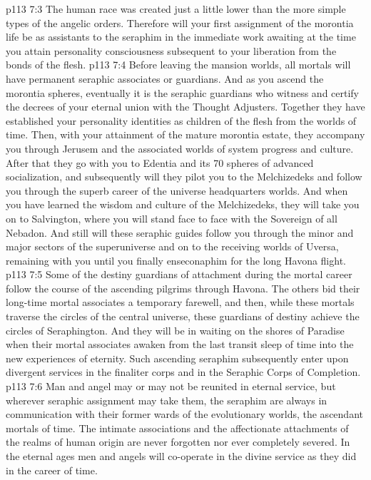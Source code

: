 \vs p113 7:3 The human race was created just a little lower than the more simple types of the angelic orders. Therefore will your first assignment of the morontia life be as assistants to the seraphim in the immediate work awaiting at the time you attain personality consciousness subsequent to your liberation from the bonds of the flesh.
\vs p113 7:4 Before leaving the mansion worlds, all mortals will have permanent seraphic associates or guardians. And as you ascend the morontia spheres, eventually it is the seraphic guardians who witness and certify the decrees of your eternal union with the Thought Adjusters. Together they have established your personality identities as children of the flesh from the worlds of time. Then, with your attainment of the mature morontia estate, they accompany you through Jerusem and the associated worlds of system progress and culture. After that they go with you to Edentia and its 70 spheres of advanced socialization, and subsequently will they pilot you to the Melchizedeks and follow you through the superb career of the universe headquarters worlds. And when you have learned the wisdom and culture of the Melchizedeks, they will take you on to Salvington, where you will stand face to face with the Sovereign of all Nebadon. And still will these seraphic guides follow you through the minor and major sectors of the superuniverse and on to the receiving worlds of Uversa, remaining with you until you finally enseconaphim for the long Havona flight.
\vs p113 7:5 Some of the destiny guardians of attachment during the mortal career follow the course of the ascending pilgrims through Havona. The others bid their long\hyp{}time mortal associates a temporary farewell, and then, while these mortals traverse the circles of the central universe, these guardians of destiny achieve the circles of Seraphington. And they will be in waiting on the shores of Paradise when their mortal associates awaken from the last transit sleep of time into the new experiences of eternity. Such ascending seraphim subsequently enter upon divergent services in the finaliter corps and in the Seraphic Corps of Completion.
\vs p113 7:6 Man and angel may or may not be reunited in eternal service, but wherever seraphic assignment may take them, the seraphim are always in communication with their former wards of the evolutionary worlds, the ascendant mortals of time. The intimate associations and the affectionate attachments of the realms of human origin are never forgotten nor ever completely severed. In the eternal ages men and angels will co\hyp{}operate in the divine service as they did in the career of time.
